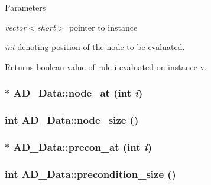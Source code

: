 \begin{DoxyParams}{Parameters}
\item[{\em vector$<$short$>$}]pointer to instance \item[{\em int}]denoting position of the node to be evaluated. \end{DoxyParams}
\begin{DoxyReturn}{Returns}
boolean value of rule i evaluated on instance v. 
\end{DoxyReturn}
\hypertarget{classAD__Data_accb4490817736df74615ef8d61d5e054}{
\subsubsection[{node\_\-at}]{$\ast$ AD\_\-Data::node\_\-at (int {\em i})}}
\label{classAD__Data_accb4490817736df74615ef8d61d5e054}
\hypertarget{classAD__Data_aff7871e090a2a6139be41a402c595e23}{
\subsubsection[{node\_\-size}]{\setlength{\rightskip}{0pt plus 5cm}int AD\_\-Data::node\_\-size ()}}
\label{classAD__Data_aff7871e090a2a6139be41a402c595e23}
\hypertarget{classAD__Data_ad6a0dc0a908f42be275f05f2f2e33ade}{
\subsubsection[{precon\_\-at}]{$\ast$ AD\_\-Data::precon\_\-at (int {\em i})}}
\label{classAD__Data_ad6a0dc0a908f42be275f05f2f2e33ade}
\hypertarget{classAD__Data_a7c736350355a4030c96d526cbfaa6078}{
\subsubsection[{precondition\_\-size}]{\setlength{\rightskip}{0pt plus 5cm}int AD\_\-Data::precondition\_\-size ()}}
